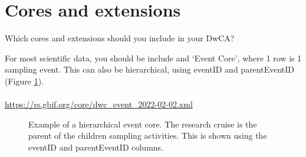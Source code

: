 \documentclass[a4paper,english, 11pt]{article}
\begin{document}
\section{Cores and extensions}
\label{s:cores and extensions}

Which cores and extensions should you include in your DwCA? 

For most scientific data, you should be include and `Event Core', where 1 row is 1 sampling event. This can also be hierarchical, using eventID and parentEventID (Figure \ref{fig:eventcore}). 
\\
\\
\url{https://rs.gbif.org/core/dwc_event_2022-02-02.xml}

\begin{figure}[htb]
    \caption{\label{fig:eventcore}
        Example of a hierarchical event core. The research cruise is the parent of the children sampling activities. This is shown using the eventID and parentEventID columns. 
    }
\end{figure}
\end{document}
